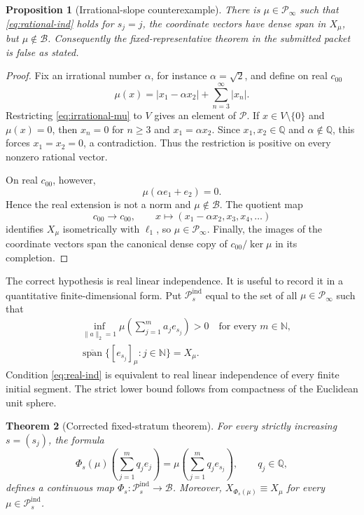 \documentclass[11pt]{article}
\newtheorem{theorem}{Theorem}[section]
\newtheorem{proposition}[theorem]{Proposition}
\theoremstyle{definition}
\newcommand{\Pcal}{\mathcal P}
\newcommand{\Bcal}{\mathcal B}
\newcommand{\N}{\mathbb N}
\newcommand{\Q}{\mathbb Q}
\newcommand{\clspan}{\overline{\operatorname{span}}}
\newcommand{\equiviso}{\equiv}
\begin{document}
\begin{proposition}[Irrational-slope counterexample]\label{prop:irrational}
There is $\mu\in\Pcal_\infty$ such that \eqref{eq:rational-ind} holds for
$s_j=j$, the coordinate vectors have dense span in $X_\mu$, but $\mu\notin\Bcal$.
Consequently the fixed-representative theorem in the submitted packet is false
as stated.
\end{proposition}

\begin{proof}
Fix an irrational number $\alpha$, for instance $\alpha=\sqrt2$, and define on
real $c_{00}$
\[
 \mu(x)=|x_1-\alpha x_2|+\sum_{n=3}^{\infty}|x_n|.
 \tag{2.2}\label{eq:irrational-mu}
\]
Restricting \eqref{eq:irrational-mu} to $V$ gives an element of $\Pcal$.  If
$x\in V\setminus\{0\}$ and $\mu(x)=0$, then $x_n=0$ for $n\geq3$ and
$x_1=\alpha x_2$.  Since $x_1,x_2\in\Q$ and $\alpha\notin\Q$, this forces
$x_1=x_2=0$, a contradiction.  Thus the restriction is positive on every
nonzero rational vector.

On real $c_{00}$, however,
\[
 \mu(\alpha e_1+e_2)=0.
\]
Hence the real extension is not a norm and $\mu\notin\Bcal$.  The quotient map
\[
 c_{00}\longrightarrow c_{00},\qquad
 x\longmapsto (x_1-\alpha x_2,x_3,x_4,\ldots)
\]
identifies $X_\mu$ isometrically with $\ell_1$, so $\mu\in\Pcal_\infty$.
Finally, the images of the coordinate vectors span the canonical dense copy of
$c_{00}/\ker\mu$ in its completion.
\end{proof}

The correct hypothesis is real linear independence.  It is useful to record it
in a quantitative finite-dimensional form.  Put $\Pcal_s^{\mathrm{ind}}$ equal
to the set of all $\mu\in\Pcal_\infty$ such that
\begin{align}
 &\inf_{\|a\|_2=1}
   \mu\left(\sum_{j=1}^m a_je_{s_j}\right)>0
   \quad\text{for every }m\in\N,                                    
   \tag{2.3}\label{eq:real-ind}\\
 &\clspan\{[e_{s_j}]_\mu:j\in\N\}=X_\mu.                           
   \tag{2.4}\label{eq:dense}
\end{align}
Condition \eqref{eq:real-ind} is equivalent to real linear independence of every
finite initial segment.  The strict lower bound follows from compactness of the
Euclidean unit sphere.

\begin{theorem}[Corrected fixed-stratum theorem]\label{thm:fixed}
For every strictly increasing $s=(s_j)$, the formula
\[
 \Phi_s(\mu)\left(\sum_{j=1}^m q_je_j\right)
 =\mu\left(\sum_{j=1}^m q_je_{s_j}\right),\qquad q_j\in\Q,
 \tag{2.5}\label{eq:fixed-map}
\]
defines a continuous map
$\Phi_s:\Pcal_s^{\mathrm{ind}}\to\Bcal$.  Moreover,
$X_{\Phi_s(\mu)}\equiviso X_\mu$ for every
$\mu\in\Pcal_s^{\mathrm{ind}}$.
\end{theorem}
\end{document}
